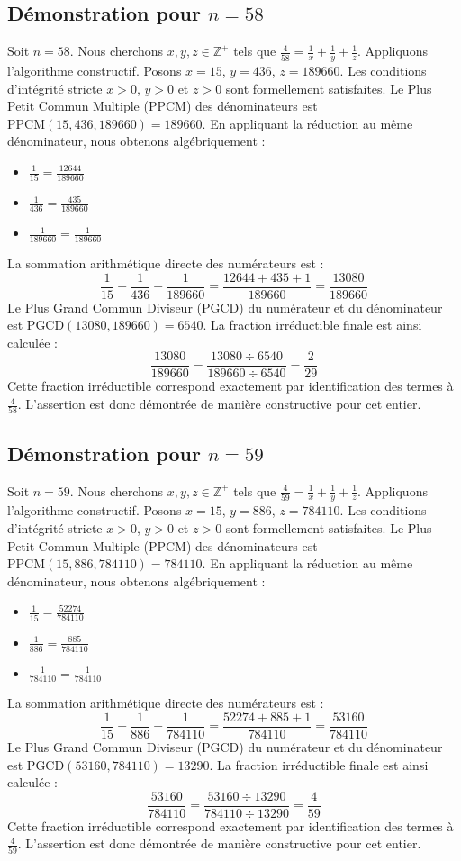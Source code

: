 \documentclass[11pt,a4paper]{article}
\begin{document}
\subsection{Démonstration pour $n = 58$}
Soit $n = 58$. Nous cherchons $x, y, z \in \mathbb{Z}^{+}$ tels que $\frac{4}{58} = \frac{1}{x} + \frac{1}{y} + \frac{1}{z}$.
Appliquons l'algorithme constructif. Posons $x = 15$, $y = 436$, $z = 189660$.
Les conditions d'intégrité stricte $x > 0$, $y > 0$ et $z > 0$ sont formellement satisfaites.
Le Plus Petit Commun Multiple (PPCM) des dénominateurs est $\text{PPCM}(15, 436, 189660) = 189660$.
En appliquant la réduction au même dénominateur, nous obtenons algébriquement :
\begin{itemize}
    \item $\frac{1}{15} = \frac{12644}{189660}$
    \item $\frac{1}{436} = \frac{435}{189660}$
    \item $\frac{1}{189660} = \frac{1}{189660}$
\end{itemize}
La sommation arithmétique directe des numérateurs est :
$$ \frac{1}{15} + \frac{1}{436} + \frac{1}{189660} = \frac{12644 + 435 + 1}{189660} = \frac{13080}{189660} $$
Le Plus Grand Commun Diviseur (PGCD) du numérateur et du dénominateur est $\text{PGCD}(13080, 189660) = 6540$.
La fraction irréductible finale est ainsi calculée :
$$ \frac{13080}{189660} = \frac{13080 \div 6540}{189660 \div 6540} = \frac{2}{29} $$
Cette fraction irréductible correspond exactement par identification des termes à $\frac{4}{58}$. L'assertion est donc démontrée de manière constructive pour cet entier.

\subsection{Démonstration pour $n = 59$}
Soit $n = 59$. Nous cherchons $x, y, z \in \mathbb{Z}^{+}$ tels que $\frac{4}{59} = \frac{1}{x} + \frac{1}{y} + \frac{1}{z}$.
Appliquons l'algorithme constructif. Posons $x = 15$, $y = 886$, $z = 784110$.
Les conditions d'intégrité stricte $x > 0$, $y > 0$ et $z > 0$ sont formellement satisfaites.
Le Plus Petit Commun Multiple (PPCM) des dénominateurs est $\text{PPCM}(15, 886, 784110) = 784110$.
En appliquant la réduction au même dénominateur, nous obtenons algébriquement :
\begin{itemize}
    \item $\frac{1}{15} = \frac{52274}{784110}$
    \item $\frac{1}{886} = \frac{885}{784110}$
    \item $\frac{1}{784110} = \frac{1}{784110}$
\end{itemize}
La sommation arithmétique directe des numérateurs est :
$$ \frac{1}{15} + \frac{1}{886} + \frac{1}{784110} = \frac{52274 + 885 + 1}{784110} = \frac{53160}{784110} $$
Le Plus Grand Commun Diviseur (PGCD) du numérateur et du dénominateur est $\text{PGCD}(53160, 784110) = 13290$.
La fraction irréductible finale est ainsi calculée :
$$ \frac{53160}{784110} = \frac{53160 \div 13290}{784110 \div 13290} = \frac{4}{59} $$
Cette fraction irréductible correspond exactement par identification des termes à $\frac{4}{59}$. L'assertion est donc démontrée de manière constructive pour cet entier.
\end{document}
